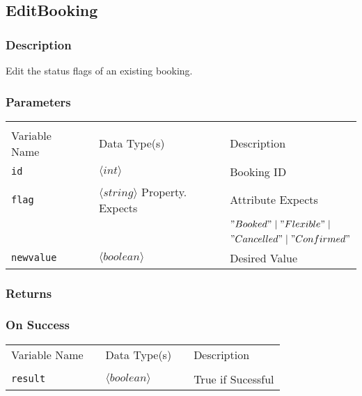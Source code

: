 \subsection{EditBooking}

\subsubsection{Description}

Edit the status flags of an existing booking.

\subsubsection{Parameters}

\begin{tabular}{lllll}
				&	&	&	&	\\
Variable Name	&		&	Data Type(s)		&	&	Description	\\
\verb!id! & \hspace{15mm} & $\langle int\rangle $ & \hspace{15mm} & Booking ID \\
\verb!flag! & \hspace{15mm} & $\langle string\rangle $ Property. Expects
& \hspace{15mm} & Attribute  Expects \\
	&	&	&	&	$"Booked" \mid "Flexible" \mid$\\ 
	&	&	&	&	$"Cancelled" \mid "Confirmed"$ \\
\verb!newvalue! & \hspace{15mm} & $\langle boolean \rangle $  & \hspace{15mm} & Desired Value \\
\end{tabular}

\subsubsection{Returns}

\subsubsection{On Success}

\begin{tabular}{lllll}
Variable Name	&		&	Data Type(s)		&	&	Description	\\
				&	&	&	&	\\
\verb!result! & \hspace{15mm} & $\langle boolean\rangle $ & \hspace{15mm} & True if Sucessful \\
\end{tabular}

